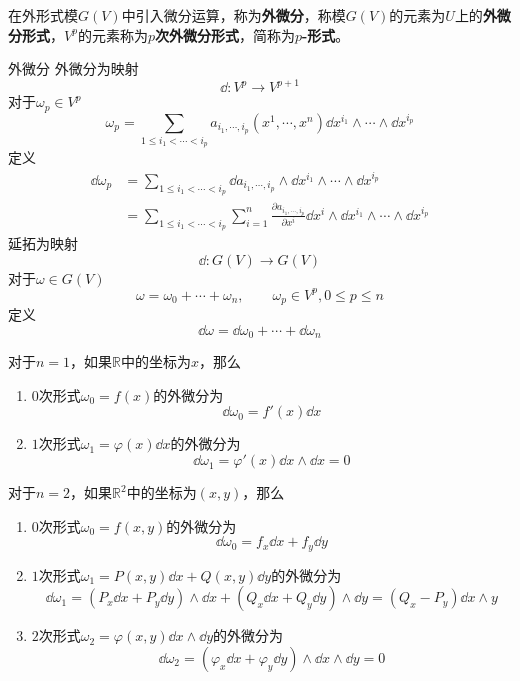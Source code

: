 \documentclass[lang = cn, scheme = chinese, thmcnt = section]{elegantbook}
\newcommand{\R}{\mathbb{R}}            %
\begin{document}
在外形式模$G(V)$中引入微分运算，称为\textbf{外微分}，称模$G(V)$的元素为$U$上的\textbf{外微分形式}，$V^p$的元素称为\textbf{$p$次外微分形式}，简称为\textbf{$p$-形式}。

\begin{definition}{外微分}
	外微分为映射%
	$$
	\dd:V^p\to V^{p+1}
	$$
	对于$\omega_p\in V^p$%
	$$
	\omega_p=\sum_{1\le i_1<\cdots<i_p}a_{i_1,\cdots,i_p}(x^1,\cdots,x^n)\dd x^{i_1}\wedge\cdots\wedge\dd x^{i_p}
	$$
	定义%
	\begin{align*}
		\dd\omega_p
		& = \sum_{1\le i_1<\cdots<i_p}\dd a_{i_1,\cdots,i_p}\wedge\dd x^{i_1}\wedge\cdots\wedge\dd x^{i_p}\\
		& = \sum_{1\le i_1<\cdots<i_p}\sum_{i=1}^{n}\frac{\partial a_{i_1,\cdots,i_p}}{\partial x^i}\dd x^i\wedge\dd x^{i_1}\wedge\cdots\wedge\dd x^{i_p}
	\end{align*}
	延拓为映射
	$$
	\dd:G(V)\to G(V)
	$$
	对于$\omega\in G(V)$%
	$$
	\omega=\omega_0+\cdots+\omega_n,\qquad \omega_p\in V^p,0\le p \le n
	$$
	定义%
	$$
	\dd\omega=\dd\omega_0+\cdots+\dd\omega_n
	$$
\end{definition}

\begin{example}
	对于$n=1$，如果$\R$中的坐标为$x$，那么
	\begin{enumerate}
		\item $0$次形式$\omega_0=f(x)$的外微分为%
		$$
		\dd\omega_0=f'(x)\dd x
		$$
		\item $1$次形式$\omega_1=\varphi(x)\dd x$的外微分为%
		$$
		\dd\omega_1=\varphi'(x)\dd x\wedge\dd x=0
		$$
	\end{enumerate}
\end{example}

\begin{example}
	对于$n=2$，如果$\R^2$中的坐标为$(x,y)$，那么
	\begin{enumerate}
		\item $0$次形式$\omega_0=f(x,y)$的外微分为%
		$$
		\dd\omega_0=f_x\dd x+f_y\dd y
		$$
		\item $1$次形式$\omega_1=P(x,y)\dd x+Q(x,y)\dd y$的外微分为%
		$$
		\dd\omega_1
		=(P_x\dd x+P_y\dd y)\wedge \dd x+(Q_x\dd x+Q_y\dd y)\wedge\dd y
		=(Q_x-P_y)\dd x\wedge y
		$$
		\item $2$次形式$\omega_2=\varphi(x,y)\dd x\wedge\dd y$的外微分为%
		$$
		\dd\omega_2
		=(\varphi_x\dd x+\varphi_y\dd y)\wedge\dd x\wedge\dd y=0
		$$
	\end{enumerate}
\end{example}
\end{document}
